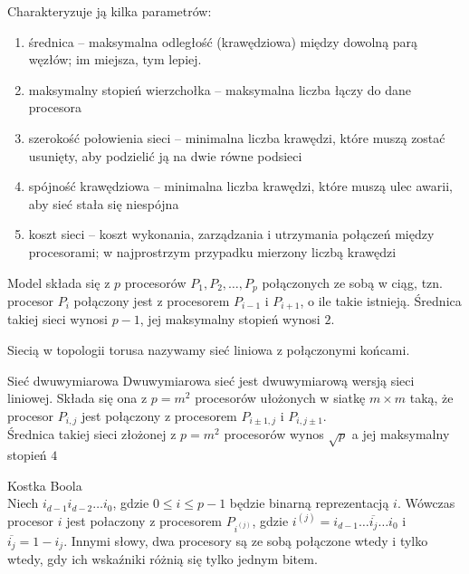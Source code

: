 Charakteryzuje ją kilka parametrów:

\begin{enumerate}
 \item średnica – maksymalna odległość (krawędziowa) między dowolną parą węzłów; im miejsza, tym lepiej.
 \item maksymalny stopień wierzchołka – maksymalna liczba łączy do dane procesora
 \item szerokość połowienia sieci – minimalna liczba krawędzi, które muszą zostać usunięty, aby podzielić ją na dwie równe podsieci
 \item spójność krawędziowa – minimalna liczba krawędzi, które muszą ulec awarii, aby sieć stała się niespójna
 \item koszt sieci – koszt wykonania, zarządzania i utrzymania połączeń między procesorami; w najprostrzym przypadku mierzony liczbą krawędzi
\end{enumerate}



\begin{przyklad}
Model składa się z \(p\) procesorów \(P_1, P_2, \dots, P_p\) połączonych ze sobą w ciąg, tzn. procesor \(P_i\) połączony jest z procesorem \(P_{i-1}\) i \(P_{i+1}\), o ile takie istnieją. Średnica takiej sieci wynosi \(p-1\), jej maksymalny stopień wynosi \(2\).\\
\end{przyklad}

\begin{przyklad}[Torus]
Siecią w topologii torusa nazywamy sieć liniowa z połączonymi końcami.
\end{przyklad}

\begin{przyklad}{Sieć dwuwymiarowa}
Dwuwymiarowa sieć jest dwuwymiarową wersją sieci liniowej. Składa się ona z \(p=m^2\) procesorów ułożonych w siatkę \(m\times m\) taką, że procesor \(P_{i,j}\) jest połączony z procesorem \(P_{i\pm 1, j}\) i \(P_{i, j\pm 1}\).\\
Średnica takiej sieci złożonej z \(p=m^2\) procesorów wynos \(\sqrt{p}\) a jej maksymalny stopień \(4\)
\end{przyklad}

\begin{definicja}{Kostka Boola}\\
Niech \(i_{d-1}i_{d-2}\dots i_{0}\), gdzie \(0\leq i \leq p-1\) będzie binarną reprezentacją \(i\). Wówczas procesor \({i}\) jest połaczony z procesorem \(P_{i^(j)}\), gdzie \(i^{(j)}=i_{d-1}\dots \overline{i_j} \dots i_0\) i \(\overline{i_j} = 1 - i_j\). Innymi słowy, dwa procesory są ze sobą połączone wtedy i tylko wtedy, gdy ich wskaźniki różnią się tylko jednym bitem.\\
\end{definicja}

